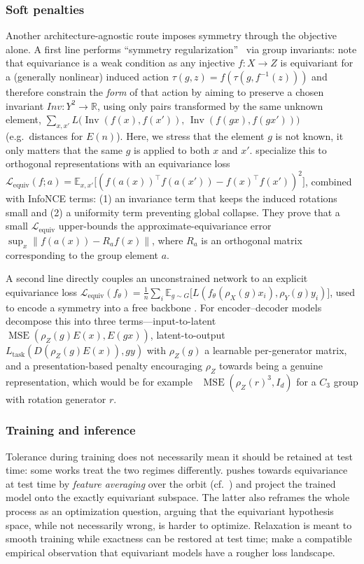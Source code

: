 \documentclass[mathematics,review,submit,moreauthors]{Definitions/mdpi}
\begin{document}
\subsubsection{Soft penalties}
Another architecture-agnostic route imposes symmetry through the objective alone.
A first line performs ``symmetry regularization''~\citep{shakerinava2022anips} via group invariants: \citet{shakerinava2022anips} note that equivariance is a weak condition as any injective $f:X\to Z$ is equivariant for a (generally nonlinear) induced action $\tau(g,z)=f(\tau(g,f^{-1}(z)))$ and therefore constrain the \emph{form} of that action by aiming to preserve a chosen invariant $Inv:Y^2\to\mathbb{R}$, using only pairs transformed by the same unknown element, $\sum_{x, x'} L\big(\operatorname{Inv}(f(x),f(x')),\,\operatorname{Inv}(f(gx),f(gx'))\big)$ (e.g.\ distances for $E(n)$).
Here, we stress that the element $g$ is not known, it only matters that the same $g$ is applied to both $x$ and $x'$.
\citet{gupta2023a} specialize this to orthogonal representations with an equivariance loss $\mathcal{L}_{\mathrm{equiv}}(f;a)=\mathbb{E}_{x,x'}\big[(f(a(x))^\top f(a(x'))-f(x)^\top f(x'))^2\big]$, combined with InfoNCE terms: (1) an invariance term that keeps the induced rotations small and (2) a uniformity term preventing global collapse.
They prove that a small $\mathcal{L}_{\mathrm{equiv}}$ upper-bounds the approximate-equivariance error $\sup_x\|f(a(x))-R_a f(x)\|$, where $R_a$ is an orthogonal matrix corresponding to the group element $a$.

A second line directly couples an unconstrained network to an explicit equivariance loss $\mathcal{L}_{\mathrm{equiv}}(f_\theta)=\frac1n\sum_i\mathbb{E}_{g\sim G}\big[L(f_\theta(\rho_X(g)x_i),\rho_Y(g)y_i)\big]$, used to encode a symmetry into a free backbone \citep{escriche2025,elhag2026}.
For encoder--decoder models \citet{ali2026} decompose this into three terms---input-to-latent $\operatorname{MSE}(\rho_Z(g)E(x),E(gx))$, latent-to-output $L_{\mathrm{task}}(D(\rho_Z(g)E(x)),gy)$ with $\rho_Z(g)$ a learnable per-generator matrix, and a presentation-based penalty encouraging $\rho_Z$ towards being a genuine representation, which would be for example \ $\operatorname{MSE}(\rho_Z(r)^3,I_d)$ for a $C_3$ group with rotation generator $r$.

\subsubsection{Training and inference}
Tolerance during training does not necessarily mean it should be retained at test time: some works treat the two regimes differently.
\citet{escriche2025} pushes towards equivariance at test time by \emph{feature averaging} over the orbit (cf.\ ) and \citet{pertigkiozoglou2024} project the trained model onto the exactly equivariant subspace.
The latter also reframes the whole process as an optimization question, arguing that the equivariant hypothesis space, while not necessarily wrong, is harder to optimize.
Relaxation is meant to smooth training while exactness can be restored at test time; \citet{elhag2026} make a compatible empirical observation that equivariant models have a rougher loss landscape.
\end{document}
